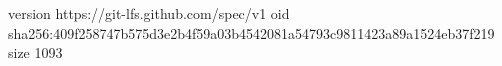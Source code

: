 version https://git-lfs.github.com/spec/v1
oid sha256:409f258747b575d3e2b4f59a03b4542081a54793c9811423a89a1524eb37f219
size 1093
